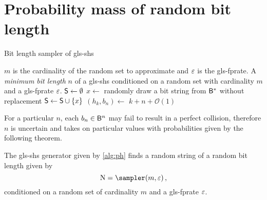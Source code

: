 \documentclass[ ../main.tex]{subfiles}
\begin{document}
\appendix
\appendixpage
\addappheadtotoc
\section{Probability mass of random bit length}
\begin{algorithm}
    \caption{Bit length sampler of \gls*{gls-shs}}
    \label{alg:sampler}
    \KwIn
    {
        $m$ is the cardinality of the random set to approximate and $\varepsilon$ is the \gls{gls-fprate}.
    }
    \KwOut
    {
        A \emph{minimum bit length} $n$ of a \gls{gls-shs} conditioned on a random set with cardinality $m$ and a \gls{gls-fprate} $\varepsilon$.
    }
    {
        $\Set{S} \gets \emptyset$\;
        {
            $x \gets $ randomly draw a bit string from $\Set{B}^{*}$ without 
            replacement\;
            $\Set{S} \gets \Set{S} \cup \{x\}$\;
        }    
        $(h_k,b_n) \gets$ \;
        \Return $k + n + \mathcal{O}(1)$\;
    }
\end{algorithm}

For a particular $n$, each $b_n \in \Set{B}^n$ may fail to result in a perfect collision, therefore $n$ is uncertain and takes on particular values with probabilities given by the following theorem.
\begin{definition}
\label{thm:N_pmf}
The \gls{gls-shs} generator given by \cref{alg:ph} finds a random string of a random bit length given by
\begin{equation}
    \RV{N} = \sampler(m, \fprate)\,,
\end{equation}
conditioned on a random set of cardinality $m$ and a \gls{gls-fprate} $\varepsilon$.
\end{definition}
\end{document}
